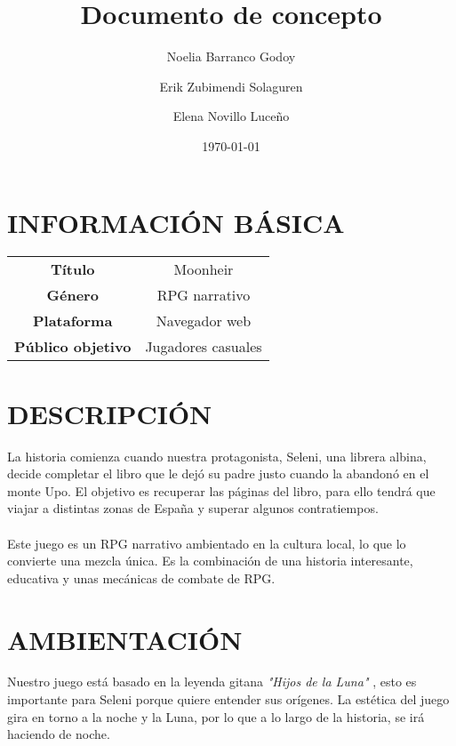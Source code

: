 \documentclass{article}
\title{Documento de concepto} %
\author{Noelia Barranco Godoy
\and Erik Zubimendi Solaguren\and
Elena Novillo Luceño}
\date{\today} %
\begin{document}
    \maketitle %
    
    \section{INFORMACIÓN BÁSICA}
    
    \begin{tabular}{||c|c||}
        \hline
        \textbf{Título} & Moonheir \\
        \textbf{Género} & RPG narrativo \\
        \textbf{Plataforma} & Navegador web\\
        \textbf{Público objetivo} & Jugadores casuales\\
        \hline
    \end{tabular}

    \section{DESCRIPCIÓN}
    La historia comienza cuando nuestra protagonista, Seleni, una librera albina,
    decide completar el libro que le dejó su padre justo cuando la abandonó en el monte Upo.
    El objetivo es recuperar las páginas del libro, para ello tendrá que viajar a distintas
    zonas de España y superar algunos contratiempos.
    \\ \\
    Este juego es un RPG narrativo ambientado en la cultura local, lo
    que lo convierte una mezcla única. Es la combinación de una historia interesante, educativa
    y unas mecánicas de combate de RPG.

    \section{AMBIENTACIÓN}
    Nuestro juego está basado en la leyenda gitana \textit{"Hijos de la Luna"}
    , esto es importante para Seleni porque quiere entender sus orígenes.
    La estética del juego gira en torno a la noche y la Luna, por lo que a lo
    largo de la historia, se irá haciendo de noche.
\end{document}

